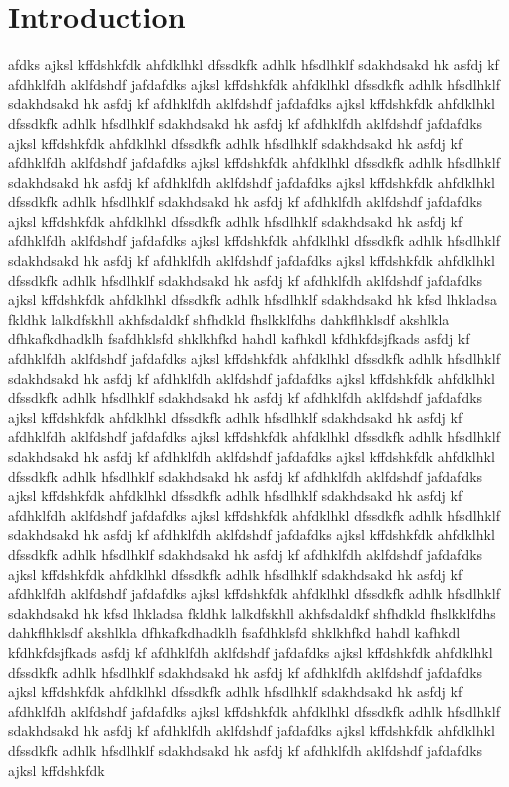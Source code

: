 \chapter*{Introduction}

afdks ajksl kffdshkfdk ahfdklhkl dfssdkfk adhlk hfsdlhklf sdakhdsakd hk asfdj kf afdhklfdh aklfdshdf jafdafdks ajksl kffdshkfdk ahfdklhkl dfssdkfk adhlk hfsdlhklf sdakhdsakd hk asfdj kf afdhklfdh aklfdshdf jafdafdks ajksl kffdshkfdk ahfdklhkl dfssdkfk adhlk hfsdlhklf sdakhdsakd hk asfdj kf afdhklfdh aklfdshdf jafdafdks ajksl kffdshkfdk ahfdklhkl dfssdkfk adhlk hfsdlhklf sdakhdsakd hk asfdj kf afdhklfdh aklfdshdf jafdafdks ajksl kffdshkfdk ahfdklhkl dfssdkfk adhlk hfsdlhklf sdakhdsakd hk asfdj kf afdhklfdh aklfdshdf jafdafdks ajksl kffdshkfdk ahfdklhkl dfssdkfk adhlk hfsdlhklf sdakhdsakd hk asfdj kf afdhklfdh aklfdshdf jafdafdks ajksl kffdshkfdk ahfdklhkl dfssdkfk adhlk hfsdlhklf sdakhdsakd hk asfdj kf afdhklfdh aklfdshdf jafdafdks ajksl kffdshkfdk ahfdklhkl dfssdkfk adhlk hfsdlhklf sdakhdsakd hk asfdj kf afdhklfdh aklfdshdf jafdafdks ajksl kffdshkfdk ahfdklhkl dfssdkfk adhlk hfsdlhklf sdakhdsakd hk asfdj kf afdhklfdh aklfdshdf jafdafdks ajksl kffdshkfdk ahfdklhkl dfssdkfk adhlk hfsdlhklf sdakhdsakd hk kfsd lhkladsa fkldhk lalkdfskhll akhfsdaldkf shfhdkld fhslkklfdhs dahkflhklsdf akshlkla dfhkafkdhadklh fsafdhklsfd shklkhfkd hahdl kafhkdl kfdhkfdsjfkads asfdj kf afdhklfdh aklfdshdf jafdafdks ajksl kffdshkfdk ahfdklhkl dfssdkfk adhlk hfsdlhklf sdakhdsakd hk asfdj kf afdhklfdh aklfdshdf jafdafdks ajksl kffdshkfdk ahfdklhkl dfssdkfk adhlk hfsdlhklf sdakhdsakd hk asfdj kf afdhklfdh aklfdshdf jafdafdks ajksl kffdshkfdk ahfdklhkl dfssdkfk adhlk hfsdlhklf sdakhdsakd hk asfdj kf afdhklfdh aklfdshdf jafdafdks ajksl kffdshkfdk ahfdklhkl dfssdkfk adhlk hfsdlhklf sdakhdsakd hk asfdj kf afdhklfdh aklfdshdf jafdafdks ajksl kffdshkfdk ahfdklhkl dfssdkfk adhlk hfsdlhklf sdakhdsakd hk asfdj kf afdhklfdh aklfdshdf jafdafdks ajksl kffdshkfdk ahfdklhkl dfssdkfk adhlk hfsdlhklf sdakhdsakd hk asfdj kf afdhklfdh aklfdshdf jafdafdks ajksl kffdshkfdk ahfdklhkl dfssdkfk adhlk hfsdlhklf sdakhdsakd hk asfdj kf afdhklfdh aklfdshdf jafdafdks ajksl kffdshkfdk ahfdklhkl dfssdkfk adhlk hfsdlhklf sdakhdsakd hk asfdj kf afdhklfdh aklfdshdf jafdafdks ajksl kffdshkfdk ahfdklhkl dfssdkfk adhlk hfsdlhklf sdakhdsakd hk asfdj kf afdhklfdh aklfdshdf jafdafdks ajksl kffdshkfdk ahfdklhkl dfssdkfk adhlk hfsdlhklf sdakhdsakd hk kfsd lhkladsa fkldhk lalkdfskhll akhfsdaldkf shfhdkld fhslkklfdhs dahkflhklsdf akshlkla dfhkafkdhadklh fsafdhklsfd shklkhfkd hahdl kafhkdl kfdhkfdsjfkads asfdj kf afdhklfdh aklfdshdf jafdafdks ajksl kffdshkfdk ahfdklhkl dfssdkfk adhlk hfsdlhklf sdakhdsakd hk asfdj kf afdhklfdh aklfdshdf jafdafdks ajksl kffdshkfdk ahfdklhkl dfssdkfk adhlk hfsdlhklf sdakhdsakd hk asfdj kf afdhklfdh aklfdshdf jafdafdks ajksl kffdshkfdk ahfdklhkl dfssdkfk adhlk hfsdlhklf sdakhdsakd hk asfdj kf afdhklfdh aklfdshdf jafdafdks ajksl kffdshkfdk ahfdklhkl dfssdkfk adhlk hfsdlhklf sdakhdsakd hk asfdj kf afdhklfdh aklfdshdf jafdafdks ajksl kffdshkfdk

